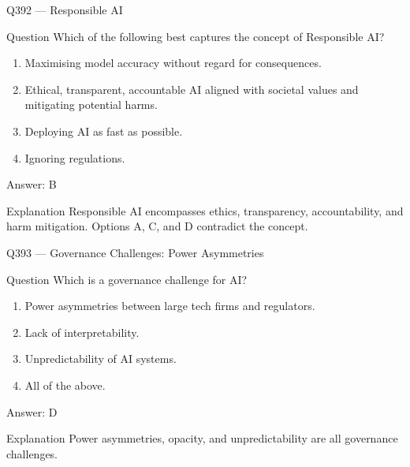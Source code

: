 \documentclass[aspectratio=169,8pt]{beamer}
\begin{document}
	\begin{frame}{Q392 --- Responsible AI}
		\begin{block}{Question}
			Which of the following best captures the concept of Responsible AI?
			\begin{enumerate}
				\item Maximising model accuracy without regard for consequences.
				\item Ethical, transparent, accountable AI aligned with societal values and mitigating potential harms.
				\item Deploying AI as fast as possible.
				\item Ignoring regulations.
			\end{enumerate}
		\end{block}
		\begin{exampleblock}{Answer: B}\end{exampleblock}
		\begin{block}{Explanation}
			Responsible AI encompasses ethics, transparency, accountability, and harm mitigation. Options A, C, and D contradict the concept.
		\end{block}
	\end{frame}
	
	\begin{frame}{Q393 --- Governance Challenges: Power Asymmetries}
		\begin{block}{Question}
			Which is a governance challenge for AI?
			\begin{enumerate}
				\item Power asymmetries between large tech firms and regulators.
				\item Lack of interpretability.
				\item Unpredictability of AI systems.
				\item All of the above.
			\end{enumerate}
		\end{block}
		\begin{exampleblock}{Answer: D}\end{exampleblock}
		\begin{block}{Explanation}
			Power asymmetries, opacity, and unpredictability are all governance challenges.
		\end{block}
	\end{frame}
	
\end{document}
